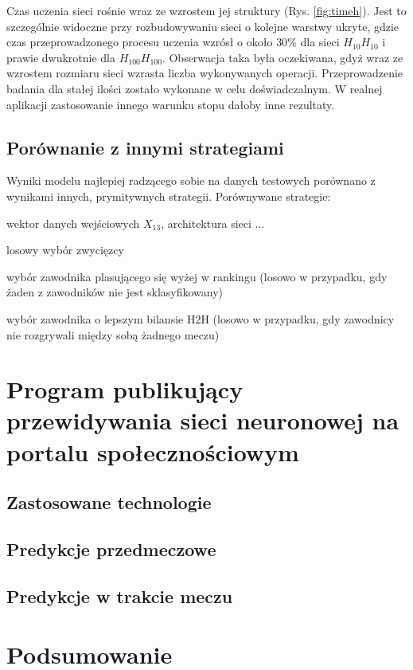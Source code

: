 Czas uczenia sieci rośnie wraz ze wzrostem jej struktury (Rys. \ref{fig:timeh}). Jest to szczególnie widoczne przy rozbudowywaniu sieci o kolejne warstwy ukryte, gdzie czas przeprowadzonego procesu uczenia wzrósł o około $30\%$ dla sieci $H_{10}H_{10}$ i prawie dwukrotnie dla $H_{100}H_{100}$. Obserwacja taka była oczekiwana, gdyż wraz ze wzrostem rozmiaru sieci wzrasta liczba wykonywanych operacji. Przeprowadzenie badania dla stałej ilości zostało wykonane w celu doświadczalnym. W realnej aplikacji zastosowanie innego warunku stopu dałoby inne rezultaty.

\section{Porównanie z innymi strategiami}
\label{Sec:VsStrat}
Wyniki modelu najlepiej radzącego sobie na danych testowych porównano z wynikami innych, prymitywnych strategii. Porównywane strategie:
\begin{tightitemize}
\item wektor danych wejściowych $X_{13}$, architektura sieci ...
\item losowy wybór zwycięzcy
\item wybór zawodnika plasującego się wyżej w rankingu (losowo w przypadku, gdy żaden z zawodników nie jest sklasyfikowany)
\item wybór zawodnika o lepszym bilansie H2H (losowo w przypadku, gdy zawodnicy nie rozgrywali między sobą żadnego meczu)
\end{tightitemize}

\chapter{Program publikujący przewidywania sieci neuronowej na portalu społecznościowym}

\section{Zastosowane technologie}
\label{Sec:BotTech}

\section{Predykcje przedmeczowe}
\label{Sec:PredykcjePrzed}

\section{Predykcje w trakcie meczu}
\label{Sec:PredykcjeLive}

\chapter{Podsumowanie}




\listoffigures
\listoftables

